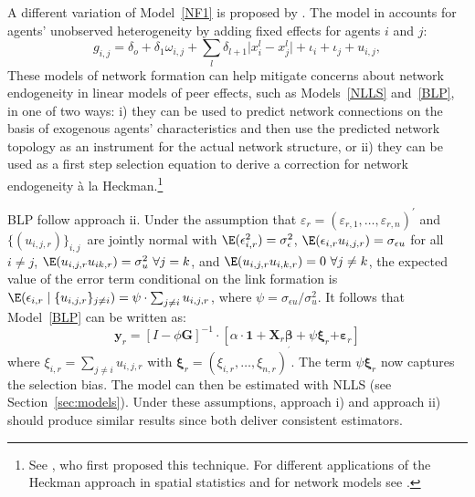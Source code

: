 \documentclass[nojss]{jss}
\begin{document}
A different variation of Model~\ref{NF1} is proposed by
\cite{Graham:2016}.  The model in \cite{Graham:2016} accounts for agents'
unobserved heterogeneity by adding fixed effects for agents $i$ and $j$:
%
\begin{equation}
g_{i,j}=\delta _{o}+\delta _{1}\omega _{i,j}+\sum_{l}\delta
_{l+1}\lvert x_{i}^{l}-x_{j}^{l} \rvert+\iota _{i}+\iota _{j}+u_{i,j},  \label{NF3}
\end{equation}
%
These models of network formation can help mitigate concerns about network
endogeneity in linear models of peer effects, such as Models~\ref{NLLS}
and~\ref{BLP}, in one of two ways: i) they can be used to predict network
connections on the basis of exogenous agents' characteristics and then use
the predicted network topology as an instrument for the actual network
structure, or ii) they can be used as a first step selection equation to
derive a correction for network endogeneity \`{a} la Heckman.\footnote{See
\cite{Heckman:1979}, who first proposed this technique.  For different
applications of the Heckman approach in spatial statistics and for network
models see \cite{Johnnson+Moon:2019,Qu+Lee:2015}.}

BLP follow approach ii.  Under the assumption that $\varepsilon
_{r}=(\varepsilon _{r,1},\dots ,\varepsilon _{r, n})^{\prime}$ and
$\{(u_{i,j,r})\}_{i,j}$\ are jointly normal with $\E(\epsilon
_{i,r}^{2})=\sigma _{\epsilon }^{2}$, $\E(\epsilon_{i,r}u_{i,j,r})=\sigma
_{\epsilon u }$ for all $i\neq j$, $\E(u_{i,j,r}u _{ik,r})=\sigma _{u }^{2}\
\forall j=k$, and $\E(u_{i,j,r}u _{i,k,r})=0\ \forall j\neq k$, the expected
value of the error term conditional on the link formation is $\E(\epsilon
_{i,r} \mid \{u_{i,j,r}\}_{j \neq i})=\psi \cdot \sum_{j\neq i}u _{i,j,r}$, where
$\psi =\sigma _{\epsilon u }/\sigma _{u }^{2}$.  It follows that Model~\ref{BLP}
can be written as:
%
\begin{equation}
\mathbf{y}_{r}=\left[ I-\phi \boldsymbol{G}\right] ^{-1}\cdot \left[ \alpha
\cdot \mathbf{1}+\boldsymbol{X}_{r}\mathbf{\beta +}\psi \mathbf{\xi }_{r}%
\mathbf{+\varepsilon }_{r}\right]   \label{final_0}
\end{equation}%
%
where $\xi _{i,r}=\sum_{j\neq i}u_{i,j,r}$ with $\mathbf{\xi
}_{r}=(\xi_{i,r},\dots,\xi _{n,r})^{^{\prime }}$.  The term $\psi \mathbf{\xi
}_{r}$ now captures the selection bias.  The model can then be estimated
with NLLS (see Section~\ref{sec:models}).  Under these assumptions, approach
i) and approach ii) should produce similar results since both deliver
consistent estimators.
\end{document}
